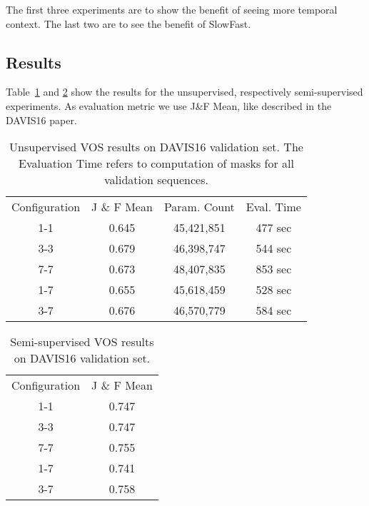 The first three experiments are to show the benefit of seeing more temporal context. The last two are to see the benefit of SlowFast. 

\subsection{Results}
Table~\ref{unsupervised_results} and \ref{semi_supervised_results} show the results for the unsupervised, respectively semi-supervised experiments. As evaluation metric we use J\&F Mean, like described in the DAVIS16\cite{davis_2016} paper.
\begin{table}[]
	\centering
	\begin{tabular}{|c|c|c|c|}
		\cline{1-4}
		Configuration & J \& F Mean & Param. Count & Eval. Time \\ \cline{1-4}
		1-1  & 0.645  & 45,421,851 & 477 sec\\ \cline{1-4}
		3-3    & 0.679 & 46,398,747 & 544 sec\\ \cline{1-4}
		7-7    & 0.673 & 48,407,835 & 853 sec\\ \cline{1-4}
		1-7    & 0.655  & 45,618,459 & 528 sec\\ \cline{1-4}
		3-7    & 0.676  & 46,570,779 & 584 sec\\ \cline{1-4}
	\end{tabular}
	\caption{Unsupervised VOS results on DAVIS16 validation set. The Evaluation Time refers to computation of masks for all validation sequences.}
	\label{unsupervised_results}
\end{table}

\begin{table}[]
	\centering
	\begin{tabular}{|c|c|}
		\cline{1-2}
		Configuration & J \& F Mean\\ \cline{1-2}
		1-1  & 0.747  \\ \cline{1-2}
		3-3    & 0.747 \\ \cline{1-2}
		7-7    & 0.755 \\ \cline{1-2}
		1-7    & 0.741  \\ \cline{1-2}
		3-7    & 0.758  \\ \cline{1-2}
	\end{tabular}
	\caption{Semi-supervised VOS results on DAVIS16 validation set.}
	\label{semi_supervised_results}
\end{table}
